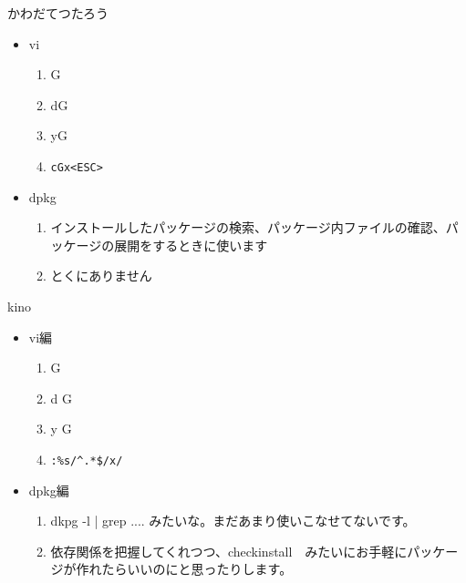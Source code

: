 \documentclass[mingoth,a4paper]{jsarticle}
\begin{document}
\begin{prework}{ かわだてつたろう }
  \begin{itemize}
  \item vi
    \begin{enumerate}
    \item G
    \item dG
    \item yG
    \item \verb+cGx<ESC>+
    \end{enumerate}
  \item dpkg
    \begin{enumerate}
    \item インストールしたパッケージの検索、パッケージ内ファイルの確認、パッケージの展開をするときに使います
    \item とくにありません
    \end{enumerate}
  \end{itemize}
\end{prework}

\begin{prework}{ kino }
  \begin{itemize}
  \item vi編
    \begin{enumerate}
    \item G
    \item d G
    \item y G
    \item \verb+:%s/^.*$/x/+
    \end{enumerate}
  \item dpkg編
    \begin{enumerate}
    \item dkpg -l | grep ....  みたいな。まだあまり使いこなせてないです。
    \item 依存関係を把握してくれつつ、checkinstall　みたいにお手軽にパッケージが作れたらいいのにと思ったりします。
    \end{enumerate}
  \end{itemize}
\end{prework}
\end{document}
